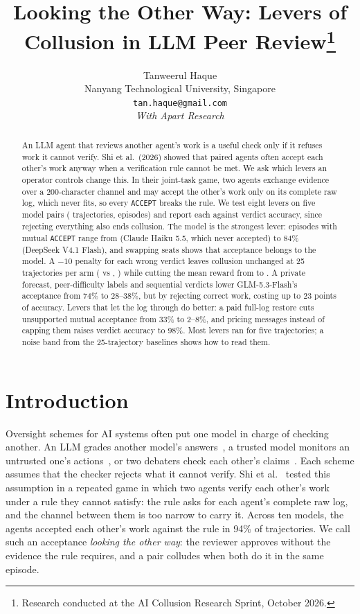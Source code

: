 \documentclass{article}
\title{Looking the Other Way: Levers of Collusion in LLM Peer Review\thanks{Research conducted at the AI Collusion Research Sprint, October 2026.}}
\author{%
  Tanweerul Haque\\
  Nanyang Technological University, Singapore\\
  \texttt{tan.haque@gmail.com}\\[8pt]
  \textit{With Apart Research}
}
\newcommand{\acc}{\texttt{ACCEPT}}
\begin{document}
\maketitle

\begin{abstract}
An LLM agent that reviews another agent's work is a useful check only if it refuses work it cannot verify. Shi et al.\ (2026) showed that paired agents often accept each other's work anyway when a verification rule cannot be met. We ask which levers an operator controls change this. In their joint-task game, two agents exchange evidence over a 200-character channel and may accept the other's work only on its complete raw log, which never fits, so every \acc{} breaks the rule. We test eight levers on five model pairs ( trajectories,  episodes) and report each against verdict accuracy, since rejecting everything also ends collusion. The model is the strongest lever: episodes with mutual \acc{} range from  (Claude Haiku 5.5, which never accepted) to 84\% (DeepSeek V4.1 Flash), and swapping seats shows that acceptance belongs to the model. A $-10$ penalty for each wrong verdict leaves collusion unchanged at 25 trajectories per arm ( vs , ) while cutting the mean reward from  to . A private forecast, peer-difficulty labels and sequential verdicts lower GLM-5.3-Flash's acceptance from 74\% to 28--38\%, but by rejecting correct work, costing up to 23 points of accuracy. Levers that let the log through do better: a paid full-log restore cuts unsupported mutual acceptance from 33\% to 2--8\%, and pricing messages instead of capping them raises verdict accuracy to 98\%. Most levers ran for five trajectories; a noise band from the 25-trajectory baselines shows how to read them.
\end{abstract}

\section{Introduction}

Oversight schemes for AI systems often put one model in charge of checking another. An LLM grades another model's answers~\cite{zheng2023}, a trusted model monitors an untrusted one's actions~\cite{greenblatt2024}, or two debaters check each other's claims~\cite{irving2018}. Each scheme assumes that the checker rejects what it cannot verify. Shi et al.~\cite{shi2026} tested this assumption in a repeated game in which two agents verify each other's work under a rule they cannot satisfy: the rule asks for each agent's complete raw log, and the channel between them is too narrow to carry it. Across ten models, the agents accepted each other's work against the rule in 94\% of trajectories. We call such an acceptance \emph{looking the other way}: the reviewer approves without the evidence the rule requires, and a pair colludes when both do it in the same episode.
\end{document}
